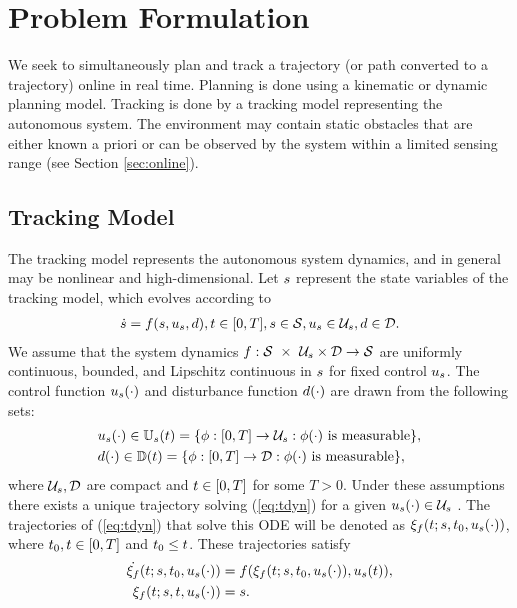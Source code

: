 \section{Problem Formulation \label{sec:formulation}}
We seek to simultaneously plan and track a trajectory (or path converted to a trajectory) online in real time. Planning is done using a kinematic or dynamic planning model. Tracking is done by a tracking model representing the autonomous system. The environment may contain static obstacles that are either known a priori or can be observed by the system within a limited sensing range (see Section \ref{sec:online}).

\subsection{Tracking Model}
The tracking model represents the autonomous system dynamics, and in general may be nonlinear and high-dimensional. Let $s$ represent the state variables of the tracking model, which evolves according to
\begin{equation}
\begin{aligned}
\label{eq:tdyn}
\dot{s} = f(s, u_s, d), t \in [0, T], s \in \mathcal{S}, u_s \in \mathcal{U}_s, d \in \mathcal{D}.
\end{aligned}
\end{equation}
We assume that the system dynamics $f : \mathcal{S}\ \times\ \mathcal{U}_s \times \mathcal{D} \rightarrow \mathcal{S}$ are uniformly continuous, bounded, and Lipschitz continuous in $s$ for fixed control $u_s$. The control function $u_s(\cdot)$ and disturbance function $d(\cdot)$ are drawn from the following sets:
\begin{align}
&u_s(\cdot) \in \mathbb{U}_s(t) = \{\phi: [0, T] \rightarrow \mathcal{U}_s: \phi(\cdot) \text{ is measurable}\},\notag\\
&d(\cdot) \in \mathbb{D}(t) = \{\phi: [0, T] \rightarrow \mathcal{D}: \phi(\cdot) \text{ is measurable}\},
\end{align}
where $\mathcal{U}_s, \mathcal{D}$ are compact and $t\in[0, T]$ for some $T>0$. Under these assumptions there exists a unique trajectory solving (\ref{eq:tdyn}) for a given $u_s(\cdot) \in \mathcal{U}_s$ \cite{Coddington84}. The trajectories of (\ref{eq:tdyn}) that solve this ODE will be denoted as $\xi_{f}(t; s, t_0, u_s(\cdot))$, where $t_0,t \in [0, T]$ and $t_0 \leq t$. These trajectories satisfy
\begin{equation}
\label{eq:fdyn_traj}
\begin{aligned}
\dot{\xi_{f}}(t; s, t_0, u_s(\cdot)) &= f(\xi_{f}(t; s, t_0, u_s(\cdot)), u_s(t)), \\
\xi_{f}(t; s, t, u_s(\cdot)) &= s.
\end{aligned}
\end{equation}


